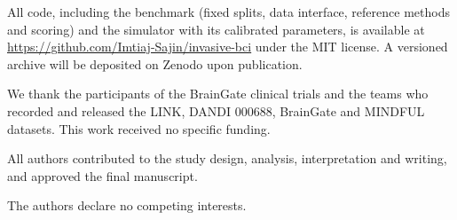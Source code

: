 \documentclass[pdflatex,sn-nature]{sn-jnl}
\begin{document}
All code, including the benchmark (fixed splits, data interface, reference methods and scoring) and the simulator with
its calibrated parameters, is available at
\url{https://github.com/Imtiaj-Sajin/invasive-bci} under the MIT license. A versioned archive will be deposited on Zenodo
upon publication.

\backmatter

We thank the participants of the BrainGate clinical trials and the teams who recorded and released the LINK, DANDI
000688, BrainGate and MINDFUL datasets. This work received no specific funding.

All authors contributed to the study design, analysis, interpretation and writing, and approved the final manuscript.

The authors declare no competing interests.


\end{document}
